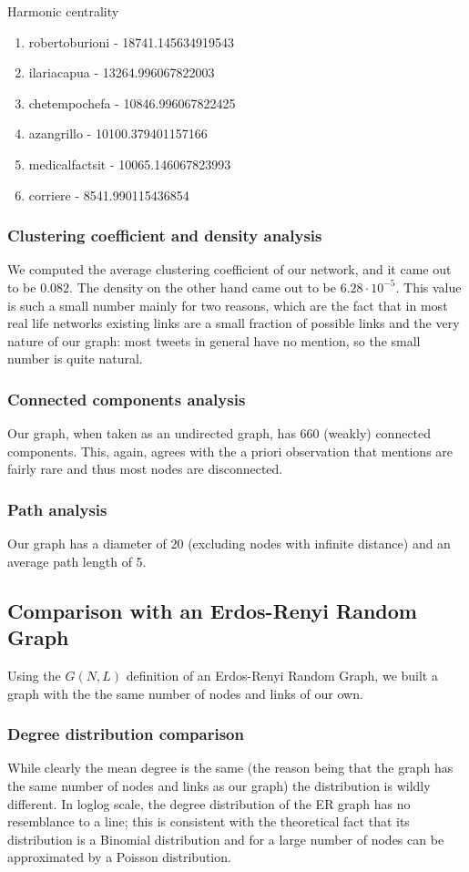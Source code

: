 \documentclass[sigchi]{acmart}
\begin{document}
Harmonic centrality
\begin{enumerate}
    \item robertoburioni - 18741.145634919543
    \item ilariacapua - 13264.996067822003
    \item chetempochefa - 10846.996067822425
    \item azangrillo - 10100.379401157166
    \item medicalfactsit - 10065.146067823993
    \item corriere - 8541.990115436854
\end{enumerate}

\subsubsection{Clustering coefficient and density analysis}
We computed the average clustering coefficient of our network, and it came out to be $0.082$. The density on the other hand came out to be $6.28\cdot10^{-5}$. This value is such a small number mainly for two reasons, which are the fact that in most real life networks existing links are a small fraction of possible links and the very nature of our graph: most tweets in general have no mention, so the small number is quite natural.
\subsubsection{Connected components analysis}
Our graph, when taken as an undirected graph, has 660 (weakly) connected components. This, again, agrees with the a priori observation that mentions are fairly rare and thus most nodes are disconnected.
\subsubsection{Path analysis}
Our graph has a diameter of 20 (excluding nodes with infinite distance) and an average path length of 5.
\subsection{Comparison with an Erdos-Renyi Random Graph}
Using the $G(N,L)$ definition of an Erdos-Renyi \cite{erdosrenyi} Random Graph, we built a graph with the the same number of nodes and links of our own.
\subsubsection{Degree distribution comparison}
While clearly the mean degree is the same (the reason being that the graph has the same number of nodes and links as our graph) the distribution is wildly different. In loglog scale, the degree distribution of the ER graph has no resemblance to a line; this is consistent with the theoretical fact that its distribution is a Binomial distribution and for a large number of nodes can be approximated by a Poisson distribution.
\end{document}
